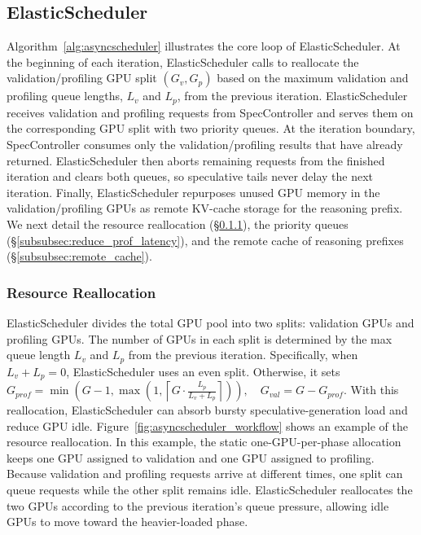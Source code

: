 \subsection{ElasticScheduler}\label{subsec:asyncscheduler}

Algorithm~\ref{alg:asyncscheduler} illustrates the core loop of ElasticScheduler.
At the beginning of each iteration, ElasticScheduler calls  to reallocate the validation/profiling GPU split
$(G_v, G_p)$ based on the maximum validation and profiling queue lengths, $L_v$ and $L_p$, from the previous iteration.
ElasticScheduler receives validation and profiling requests from SpecController and serves them on the corresponding GPU split with two priority queues.
At the iteration boundary, SpecController consumes only the validation/profiling
results that have already returned.
ElasticScheduler then aborts remaining requests from the finished iteration and
clears both queues, so speculative tails never delay the next iteration.
Finally, ElasticScheduler repurposes unused GPU memory in the validation/profiling
GPUs as remote KV-cache storage for the reasoning prefix.
We next detail the resource reallocation (\S\ref{subsubsec:priqueue}), the priority queues (\S\ref{subsubsec:reduce_prof_latency}), and the remote
cache of reasoning prefixes (\S\ref{subsubsec:remote_cache}).

\subsubsection{Resource Reallocation}\label{subsubsec:priqueue}

ElasticScheduler divides the total GPU pool into two splits: validation GPUs and profiling GPUs.
The number of GPUs in each split is determined by the max queue length $L_v$ and $L_p$ from the previous iteration.
Specifically, when $L_v + L_p = 0$, ElasticScheduler uses an even split.
Otherwise, it sets $G_{prof} = \min(G-1, \max(1, \left\lceil G \cdot \frac{L_p}{L_v + L_p} \right\rceil)), 
\quad G_{val} = G - G_{prof}$.
With this reallocation, ElasticScheduler can absorb bursty speculative-generation load and reduce GPU idle.
Figure~\ref{fig:asyncscheduler_workflow} shows an example of the resource reallocation.
In this example, the static one-GPU-per-phase allocation keeps one GPU assigned
to validation and one GPU assigned to profiling.
Because validation and profiling requests arrive at different times, one split
can queue requests while the other split remains idle.
ElasticScheduler reallocates the two GPUs according to the previous iteration's
queue pressure, allowing idle GPUs to move toward the heavier-loaded phase.



